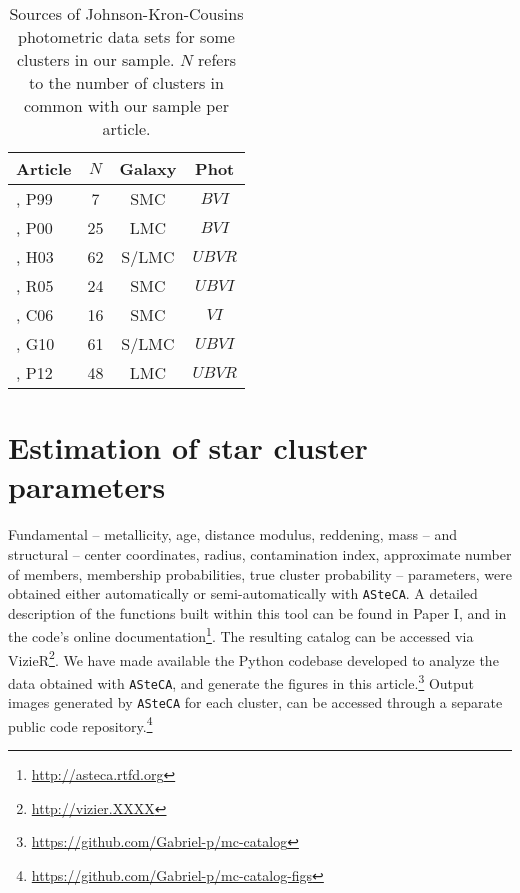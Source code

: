 \documentclass{aa}
\begin{document}
\begin{table}
\centering
  \caption{Sources of Johnson-Kron-Cousins photometric data sets for some
  clusters in our sample. $N$ refers to the number of clusters in common with
  our sample per article.}
\label{tab:databases}
 \begin{tabular}{l c c c}
\hline\hline
Article & $N$ & Galaxy & Phot\\
\hline
\cite{Pietrzynski1999}, P99 & 7 & SMC & $BVI$ \\ 
\cite{Pietrzynski2000}, P00 & 25 & LMC & $BVI$ \\ 
\cite{Hunter_2003}, H03 & 62 & S/LMC & $UBVR$ \\ 
\cite{Rafelski_2005}, R05 & 24 & SMC & $UBVI$ \\ 
\cite{Chiosi_2006}, C06 & 16 & SMC & $VI$ \\ 
\cite{Glatt_2010}, G10 & 61 & S/LMC & $UBVI$ \\ 
\cite{Popescu_2012}, P12 & 48 & LMC & $UBVR$ \\ 
\hline
 \end{tabular} 
\end{table}
  




\section{Estimation of star cluster parameters}
\label{sec:fund-params}

Fundamental -- metallicity, age, distance modulus, reddening, mass -- and
structural -- center coordinates, radius, contamination index, approximate
number of members, membership probabilities, true cluster probability --
parameters, were obtained either automatically or semi-automatically with
\texttt{ASteCA}.
%
A detailed description of the functions built within this tool can be found in
Paper I, and in the code's online
documentation\footnote{\url{http://asteca.rtfd.org}}.
%
The resulting catalog can be accessed via
VizieR\footnote{\url{http://vizier.XXXX}}.
We have made available the Python codebase developed to analyze
the data obtained with \texttt{ASteCA}, and generate the figures in this
article.\footnote{\url{https://github.com/Gabriel-p/mc-catalog}}
%
Output images generated by \texttt{ASteCA} for each cluster, can be
accessed through a separate public code
repository.\footnote{\url{https://github.com/Gabriel-p/mc-catalog-figs}}
\end{document}

